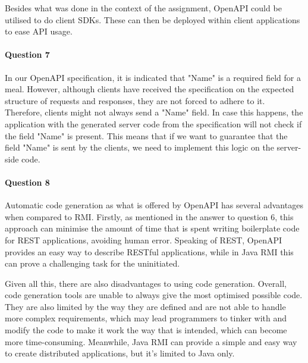 \documentclass{ds-report}
\begin{document}
    Besides what was done in the context of the assignment, OpenAPI could be utilised to do client SDKs\cite{OpenAPI_Jetbrains}. These can then be deployed within client applications to ease API usage.

    \paragraph{Question 7}

    In our OpenAPI specification, it is indicated that "Name" is a required field for a meal. However, although clients have received the specification on the expected structure of requests and responses, they are not forced to adhere to it. Therefore, clients might not always send a "Name" field. In case this happens, the application with the generated server code from the specification will not check if the field "Name" is present. This means that if we want to guarantee that the field "Name" is sent by the clients, we need to implement this logic on the server-side code.


    \paragraph{Question 8} 

    Automatic code generation as what is offered by OpenAPI has several advantages when compared to RMI. Firstly, as mentioned in the answer to question 6, this approach can minimise the amount of time that is spent writing boilerplate code for REST applications, avoiding human error. Speaking of REST, OpenAPI provides an easy way to describe RESTful applications, while in Java RMI this can prove a challenging task for the uninitiated.

    Given all this, there are also disadvantages to using code generation. Overall, code generation tools are unable to always give the most optimised possible code. They are also limited by the way they are defined and are not able to handle more complex requirements, which may lead programmers to tinker with and modify the code to make it work the way that is intended, which can become more time-consuming. Meanwhile, Java RMI can provide a simple and easy way to create distributed applications, but it's limited to Java only. 
\end{document}
